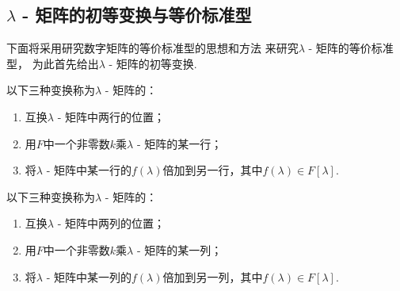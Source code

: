 \subsection{\texorpdfstring{$\lambda$}{\textlambda} - 矩阵的初等变换与等价标准型}
下面将采用研究数字矩阵的等价标准型的思想和方法
来研究\(\lambda\) - 矩阵的等价标准型，
为此首先给出\(\lambda\) - 矩阵的初等变换.
\begin{definition}
以下三种变换称为\(\lambda\) - 矩阵的：\begin{enumerate}
	\item 互换\(\lambda\) - 矩阵中两行的位置；
	\item 用\(F\)中一个非零数\(k\)乘\(\lambda\) - 矩阵的某一行；
	\item 将\(\lambda\) - 矩阵中某一行的\(f(\lambda)\)倍加到另一行，其中\(f(\lambda) \in F[\lambda]\).
\end{enumerate}
\end{definition}\begin{definition}
以下三种变换称为\(\lambda\) - 矩阵的：\begin{enumerate}
	\item 互换\(\lambda\) - 矩阵中两列的位置；
	\item 用\(F\)中一个非零数\(k\)乘\(\lambda\) - 矩阵的某一列；
	\item 将\(\lambda\) - 矩阵中某一列的\(f(\lambda)\)倍加到另一列，其中\(f(\lambda) \in F[\lambda]\).
\end{enumerate}
\end{definition}

